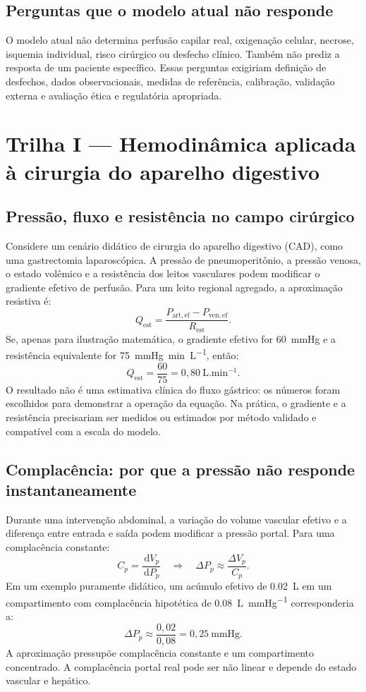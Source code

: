 \documentclass[11pt,a4paper,oneside]{book}
\newcommand{\dd}{\,\mathrm{d}}
\begin{document}
\section{Perguntas que o modelo atual não responde}
O modelo atual não determina perfusão capilar real, oxigenação celular, necrose, isquemia individual, risco cirúrgico ou desfecho clínico. Também não prediz a resposta de um paciente específico. Essas perguntas exigiriam definição de desfechos, dados observacionais, medidas de referência, calibração, validação externa e avaliação ética e regulatória apropriada.

\chapter{Trilha I — Hemodinâmica aplicada à cirurgia do aparelho digestivo}

\section{Pressão, fluxo e resistência no campo cirúrgico}
Considere um cenário didático de cirurgia do aparelho digestivo (CAD), como uma gastrectomia laparoscópica. A pressão de pneumoperitônio, a pressão venosa, o estado volêmico e a resistência dos leitos vasculares podem modificar o gradiente efetivo de perfusão. Para um leito regional agregado, a aproximação resistiva é:
\begin{equation}
  Q_{\mathrm{est}}=\frac{P_{\mathrm{art,ef}}-P_{\mathrm{ven,ef}}}{R_{\mathrm{est}}}.
\end{equation}
Se, apenas para ilustração matemática, o gradiente efetivo for \SI{60}{mmHg} e a resistência equivalente for \SI{75}{mmHg.min.L^{-1}}, então:
\[
Q_{\mathrm{est}}=\frac{60}{75}=0{,}80\ \mathrm{L.min^{-1}}.
\]
O resultado não é uma estimativa clínica do fluxo gástrico: os números foram escolhidos para demonstrar a operação da equação. Na prática, o gradiente e a resistência precisariam ser medidos ou estimados por método validado e compatível com a escala do modelo.

\section{Complacência: por que a pressão não responde instantaneamente}
Durante uma intervenção abdominal, a variação do volume vascular efetivo e a diferença entre entrada e saída podem modificar a pressão portal. Para uma complacência constante:
\begin{equation}
  C_p=\frac{\dd V_p}{\dd P_p}
  \quad\Longrightarrow\quad
  \Delta P_p\approx\frac{\Delta V_p}{C_p}.
\end{equation}
Em um exemplo puramente didático, um acúmulo efetivo de \SI{0.02}{L} em um compartimento com complacência hipotética de \SI{0.08}{L.mmHg^{-1}} corresponderia a:
\[
\Delta P_p\approx\frac{0{,}02}{0{,}08}=0{,}25\ \mathrm{mmHg}.
\]
A aproximação pressupõe complacência constante e um compartimento concentrado. A complacência portal real pode ser não linear e depende do estado vascular e hepático.
\end{document}

